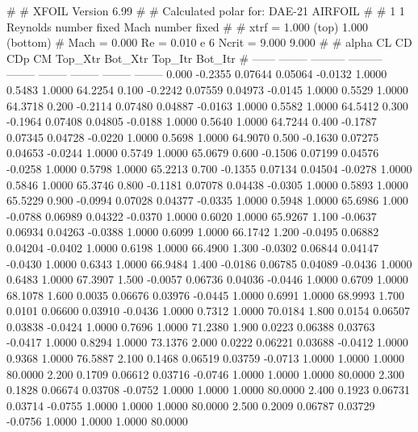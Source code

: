 #  
#       XFOIL         Version 6.99
#  
# Calculated polar for: DAE-21 AIRFOIL                                  
#  
# 1 1 Reynolds number fixed          Mach number fixed         
#  
# xtrf =   1.000 (top)        1.000 (bottom)  
# Mach =   0.000     Re =     0.010 e 6     Ncrit =   9.000  9.000
#  
#   alpha    CL        CD       CDp       CM     Top_Xtr  Bot_Xtr  Top_Itr  Bot_Itr
#  ------ -------- --------- --------- -------- -------- -------- -------- --------
   0.000  -0.2355   0.07644   0.05064  -0.0132   1.0000   0.5483   1.0000  64.2254
   0.100  -0.2242   0.07559   0.04973  -0.0145   1.0000   0.5529   1.0000  64.3718
   0.200  -0.2114   0.07480   0.04887  -0.0163   1.0000   0.5582   1.0000  64.5412
   0.300  -0.1964   0.07408   0.04805  -0.0188   1.0000   0.5640   1.0000  64.7244
   0.400  -0.1787   0.07345   0.04728  -0.0220   1.0000   0.5698   1.0000  64.9070
   0.500  -0.1630   0.07275   0.04653  -0.0244   1.0000   0.5749   1.0000  65.0679
   0.600  -0.1506   0.07199   0.04576  -0.0258   1.0000   0.5798   1.0000  65.2213
   0.700  -0.1355   0.07134   0.04504  -0.0278   1.0000   0.5846   1.0000  65.3746
   0.800  -0.1181   0.07078   0.04438  -0.0305   1.0000   0.5893   1.0000  65.5229
   0.900  -0.0994   0.07028   0.04377  -0.0335   1.0000   0.5948   1.0000  65.6986
   1.000  -0.0788   0.06989   0.04322  -0.0370   1.0000   0.6020   1.0000  65.9267
   1.100  -0.0637   0.06934   0.04263  -0.0388   1.0000   0.6099   1.0000  66.1742
   1.200  -0.0495   0.06882   0.04204  -0.0402   1.0000   0.6198   1.0000  66.4900
   1.300  -0.0302   0.06844   0.04147  -0.0430   1.0000   0.6343   1.0000  66.9484
   1.400  -0.0186   0.06785   0.04089  -0.0436   1.0000   0.6483   1.0000  67.3907
   1.500  -0.0057   0.06736   0.04036  -0.0446   1.0000   0.6709   1.0000  68.1078
   1.600   0.0035   0.06676   0.03976  -0.0445   1.0000   0.6991   1.0000  68.9993
   1.700   0.0101   0.06600   0.03910  -0.0436   1.0000   0.7312   1.0000  70.0184
   1.800   0.0154   0.06507   0.03838  -0.0424   1.0000   0.7696   1.0000  71.2380
   1.900   0.0223   0.06388   0.03763  -0.0417   1.0000   0.8294   1.0000  73.1376
   2.000   0.0222   0.06221   0.03688  -0.0412   1.0000   0.9368   1.0000  76.5887
   2.100   0.1468   0.06519   0.03759  -0.0713   1.0000   1.0000   1.0000  80.0000
   2.200   0.1709   0.06612   0.03716  -0.0746   1.0000   1.0000   1.0000  80.0000
   2.300   0.1828   0.06674   0.03708  -0.0752   1.0000   1.0000   1.0000  80.0000
   2.400   0.1923   0.06731   0.03714  -0.0755   1.0000   1.0000   1.0000  80.0000
   2.500   0.2009   0.06787   0.03729  -0.0756   1.0000   1.0000   1.0000  80.0000
